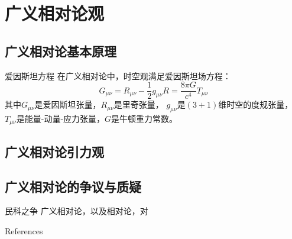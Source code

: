 \documentclass[10pt,aspectratio=43,mathserif]{beamer}
\begin{document}
\section{广义相对论观}
\subsection{广义相对论基本原理}

\begin{frame}{爱因斯坦方程}
    在广义相对论中，时空观满足爱因斯坦场方程：
    \begin{equation}
        G_{\mu \nu } = R_{\mu \nu} - \frac{1}{2}g_{\mu \nu}R=\frac{8\pi G}{c^4}T_{\mu \nu}
        \label{eq:EinEq}
    \end{equation} 
    其中$G_{\mu \nu}$是爱因斯坦张量，$R_{\mu \nu}$是里奇张量，
    $g_{\mu \nu}$是$(3+1)$维时空的度规张量，$T_{\mu \nu}$是能量-动量-应力张量，$G$是牛顿重力常数。
\end{frame}


\subsection{广义相对论引力观}
\begin{frame}{}
\end{frame}


\subsection{广义相对论的争议与质疑}
\begin{frame}{民科之争}
    广义相对论，以及相对论，对
\end{frame}

\begin{frame}[allowframebreaks]{References}
	
	
\end{frame}
\end{document}
